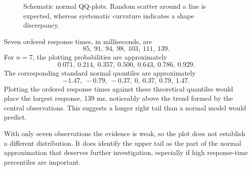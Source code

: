 \begin{figure}[htbp]
\centering
\begin{minipage}{0.48\textwidth}
\centering
{}
\end{minipage}\hfill
\begin{minipage}{0.48\textwidth}
\centering
{}
\end{minipage}
\caption{Schematic normal QQ-plots. Random scatter around a line is expected, whereas systematic curvature indicates a shape discrepancy.}
\label{fig:qq-patterns}
\end{figure}
\FloatBarrier

\begin{example}\par
Seven ordered response times, in milliseconds, are
\[
    85,\ 91,\ 94,\ 98,\ 103,\ 111,\ 139.
\]
For $n=7$, the plotting probabilities are approximately
\[
    0.071,\ 0.214,\ 0.357,\ 0.500,\ 0.643,\ 0.786,\ 0.929.
\]
The corresponding standard normal quantiles are approximately
\[
    -1.47,\ -0.79,\ -0.37,\ 0,\ 0.37,\ 0.79,\ 1.47.
\]
Plotting the ordered response times against these theoretical quantiles would place the largest response, 139 ms, noticeably above the trend formed by the central observations. This suggests a longer right tail than a normal model would predict.

With only seven observations the evidence is weak, so the plot does not establish a different distribution. It does identify the upper tail as the part of the normal approximation that deserves further investigation, especially if high response-time percentiles are important.
\end{example}

